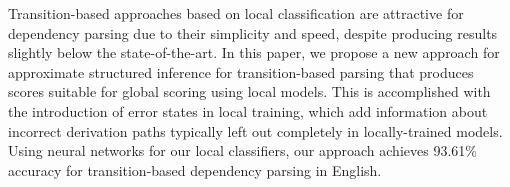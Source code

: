 Transition-based approaches based on local classification are attractive for dependency parsing due to their simplicity and speed, despite producing results slightly below the state-of-the-art. In this paper, we propose a new approach for approximate structured inference for transition-based parsing that produces scores suitable for global scoring using local models. This is accomplished with the introduction of error states in local training, which add information about incorrect derivation paths typically left out completely in locally-trained models. Using neural networks for our local classifiers, our approach achieves 93.61\% accuracy for transition-based dependency parsing in English.